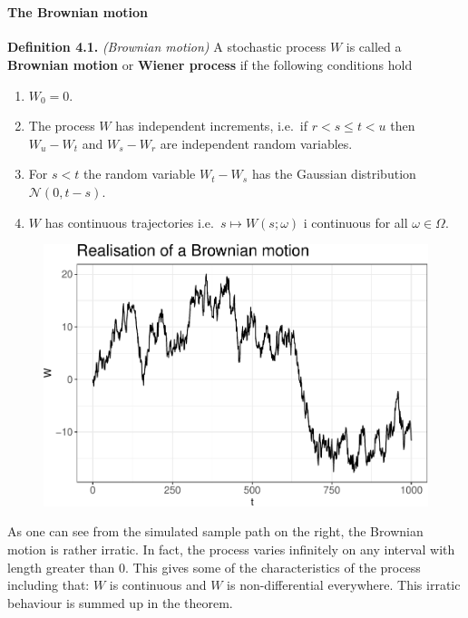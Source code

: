 \documentclass[
]{article}
\providecommand{\tightlist}{%
  \setlength{\itemsep}{0pt}\setlength{\parskip}{0pt}}
\begin{document}
~

\hypertarget{the-brownian-motion}{%
\paragraph{The Brownian motion}\label{the-brownian-motion}}

\textbf{Definition 4.1.} \emph{(Brownian motion)} A stochastic process
\(W\) is called a \textbf{Brownian motion} or \textbf{Wiener process} if
the following conditions hold

\begin{enumerate}
\def\labelenumi{\arabic{enumi}.}
\tightlist
\item
  \(W_0=0\).
\item
  The process \(W\) has independent increments, i.e.~if \(r<s\le t< u\)
  then \(W_u-W_t\) and \(W_s-W_r\) are independent random variables.
\item
  For \(s<t\) the random variable \(W_t-W_s\) has the Gaussian
  distribution \(\mathcal{N}(0,t-s)\).
\item
  \(W\) has continuous trajectories i.e.~\(s\mapsto W(s;\omega)\) i
  continuous for all \(\omega \in\Omega\).
\end{enumerate}

\begin{figure}\includegraphics{FinKont_homework_files/figure-latex/unnamed-chunk-3-1}\end{figure}

As one can see from the simulated sample path on the right, the Brownian
motion is rather irratic. In fact, the process varies infinitely on any
interval with length greater than 0. This gives some of the
characteristics of the process including that: \(W\) is continuous and
\(W\) is non-differential everywhere. This irratic behaviour is summed
up in the theorem.
\end{document}
